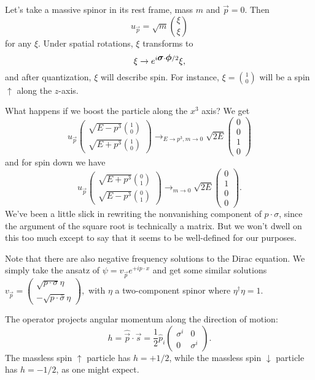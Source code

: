 \begin{exm}
Let's take a massive spinor in its rest frame, mass $m$ and $\vec p=0$. Then 
$$u_{\vec p}=\sqrt{m}{\xi \choose \xi}$$
for any $\xi$. Under spatial rotations, $\xi$ transforms to
$$\xi \to e^{i\mbox{\boldmath$ \sigma $} \cdot \mbox{\boldmath$ \phi $}/2}\xi,$$
and after quantization, $\xi$ will describe spin. For instance, $\xi={1\choose 0}$ will be a spin $\uparrow$ along the $z$-axis.

What happens if we boost the particle along the $x^3$ axis? We get
$$u_{\vec p}\begin{pmatrix}\sqrt{E-p^3} {1\choose 0}\\
\sqrt{E+p^3}{1\choose 0}
\end{pmatrix}\to_{E\to p^3, m\to 0} \sqrt{2E} \begin{pmatrix}0\\0\\1\\0\end{pmatrix}$$
and for spin down we have
$$u_{\vec p}\begin{pmatrix}\sqrt{E+p^3} {0\choose 1}\\
\sqrt{E-p^3}{0\choose 1}
\end{pmatrix}\to_{m\to 0} \sqrt{2E} \begin{pmatrix}0\\1\\0\\0\end{pmatrix}.$$
We've been a little slick in rewriting the nonvanishing component of $p\cdot \sigma$, since the argument of the square root is technically a matrix. But we won't dwell on this too much except to say that it seems to be well-defined for our purposes.
\end{exm}

Note that there are also negative frequency solutions to the Dirac equation. We simply take the ansatz of 
$\psi= v_{\vec p} e^{+ip\cdot x}$ and get some similar solutions $v_{\vec p}=\begin{pmatrix} \sqrt{p\cdot \sigma}\eta \\ -\sqrt{p \cdot \bar \sigma}\eta\end{pmatrix},$ with $\eta$ a two-component spinor where $\eta^\dagger \eta =1$.

\begin{defn} The  operator projects angular momentum along the direction of motion:
$$h=\hat{\vec p}\cdot \vec s =\frac{1}{2} \hat p_i \begin{pmatrix} \sigma^i & 0\\0&\sigma^i
\end{pmatrix}.$$
The massless spin $\uparrow$ particle has $h=+1/2$, while the massless spin $\downarrow$ particle has $h=-1/2$, as one might expect.
\end{defn}

